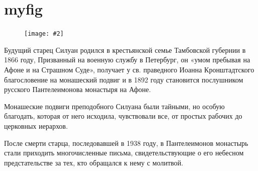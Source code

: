 \documentclass[12pt,a4paper]{article}
\newcommand{\myfigr}[2][0.43]{
\begin{figure}
\texttt{[image: \#2]}
\end{figure}
}
\begin{document}
\newpage\section{myfig}
\setlength\intextsep{0pt}
\myfigr[0.15]{img/521.jpg}

Будущий старец Силуан родился в крестьянской семье Тамбовской губернии в 1866 году, Призванный на военную службу в Петербург, он «умом пребывая на Афоне и на Страшном Суде», получает у св. праведного Иоанна Кронштадтского благословение на монашеский подвиг и в 1892 году становится послушником русского Пантелеимонова монастыря на Афоне.

Монашеские подвиги преподобного Силуана были тайными, но особую благодать, которая от него исходила, чувствовали все, от простых рабочих до церковных иерархов. 

После смерти старца, последовавшей в 1938 году, в Пантелеимонов монастырь стали приходить многочисленные письма, свидетельствующие о его небесном предстательстве за тех, кто обращался к нему с молитвой.
\end{document}
